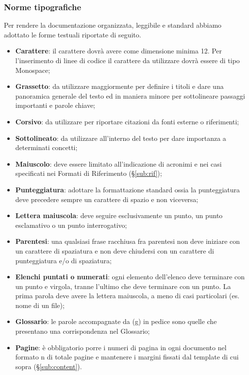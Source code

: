 {{		\subsubsection{Norme tipografiche}{
			\label{sub:typo}
			Per rendere la documentazione organizzata, leggibile e standard abbiamo adottato le forme testuali riportate di seguito.
			\begin{itemize}
				\item \textbf{Carattere}: il carattere dovrà avere come dimensione minima 12. Per l'inserimento di linee di codice il carattere da utilizzare dovrà essere di tipo Monospace;
				\item \textbf{Grassetto}: da utilizzare maggiormente per definire i titoli e dare una panoramica generale del testo ed in maniera minore per sottolineare passaggi importanti e parole chiave;
				\item \textbf{Corsivo}: da utilizzare per riportare citazioni da fonti esterne o riferimenti;
				\item \textbf{Sottolineato}: da utilizzare all'interno del testo per dare importanza a determinati concetti;
				\item \textbf{Maiuscolo}: deve essere limitato all’indicazione di acronimi e nei casi specificati nei Formati di Riferimento (\S\ref{sub:rif});
				\item \textbf{Punteggiatura}: adottare la formattazione standard ossia la punteggiatura deve precedere sempre un carattere di spazio e non viceversa;
				\item \textbf{Lettera maiuscola}: deve seguire esclusivamente un punto, un punto esclamativo o un punto interrogativo;
				\item \textbf{Parentesi}: una qualsiasi frase racchiusa fra parentesi non deve iniziare con un carattere di spaziatura e non deve chiudersi con un carattere di punteggiatura e/o di spaziatura;
				\item \textbf{Elenchi puntati o numerati}: ogni elemento dell’elenco deve terminare con un punto e virgola, tranne l’ultimo che deve terminare con un punto. La prima parola deve avere la lettera maiuscola, a meno di casi particolari (es. nome di un file);
				\item \textbf{Glossario}: le parole accompagnate da (g) in pedice sono quelle che presentano una corrispondenza nel Glossario;
				\item \textbf{Pagine}: è obbligatorio porre i numeri di pagina in ogni documento nel formato {n} di {totale pagine} e mantenere i margini fissati dal template di cui sopra (\S\ref{sub:content}).
			\end{itemize}
		}
}}
